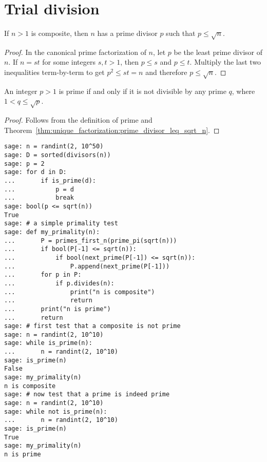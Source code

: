 \section{Trial division}

\begin{theorem}
\label{thm:unique_factorization:prime_divisor_leq_sqrt_n}
If $n > 1$ is composite, then $n$ has a prime divisor
$p$ such that $p \leq \sqrt{n}$.
\end{theorem}

\begin{proof}
In the canonical prime factorization of $n$, let $p$ be the least
prime divisor of $n$. If $n = st$ for some integers $s,t > 1$, then
$p \leq s$ and $p \leq t$. Multiply the last two inequalities
term-by-term to get $p^2 \leq st = n$ and therefore $p \leq \sqrt{n}$.
\end{proof}

\begin{corollary}
\label{cor:unique_factorization:n_prime_iff_not_divisible_by_prime_leq_sqrt_n}
An integer $p > 1$ is prime if and only if it is not divisible by any
prime $q$, where $1 < q \leq \sqrt{p}$.
\end{corollary}

\begin{proof}
Follows from the definition of prime and
Theorem~\ref{thm:unique_factorization:prime_divisor_leq_sqrt_n}.
\end{proof}

\begin{lstlisting}
sage: n = randint(2, 10^50)
sage: D = sorted(divisors(n))
sage: p = 2
sage: for d in D:
...       if is_prime(d):
...           p = d
...           break
sage: bool(p <= sqrt(n))
True
sage: # a simple primality test
sage: def my_primality(n):
...       P = primes_first_n(prime_pi(sqrt(n)))
...       if bool(P[-1] <= sqrt(n)):
...           if bool(next_prime(P[-1]) <= sqrt(n)):
...               P.append(next_prime(P[-1]))
...       for p in P:
...           if p.divides(n):
...               print("n is composite")
...               return
...       print("n is prime")
...       return
sage: # first test that a composite is not prime
sage: n = randint(2, 10^10)
sage: while is_prime(n):
...       n = randint(2, 10^10)
sage: is_prime(n)
False
sage: my_primality(n)
n is composite
sage: # now test that a prime is indeed prime
sage: n = randint(2, 10^10)
sage: while not is_prime(n):
...       n = randint(2, 10^10)
sage: is_prime(n)
True
sage: my_primality(n)
n is prime
\end{lstlisting}

